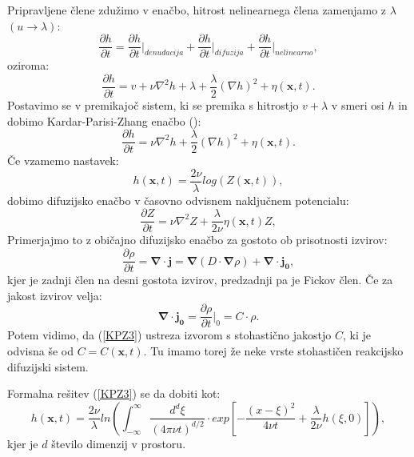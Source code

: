 \documentclass[a4paper, twoside, 12pt]{book}
\begin{document}
Pripravljene člene zdužimo v enačbo, hitrost nelinearnega člena zamenjamo z $\lambda$ $(u \rightarrow \lambda)$:
\begin{equation}
  \frac{\partial h}{\partial t} = \frac{\partial h}{\partial t} \bigg|_{denudacija} + \frac{\partial h}{\partial t} \bigg|_{difuzija} + \frac{\partial h}{\partial t} \bigg|_{nelinearno},
  \label{KPZ1}
\end{equation}
oziroma:
\begin{equation}
  \frac{\partial h}{\partial t} = v + \nu \nabla^2 h + \lambda + \frac{\lambda}{2} (\nabla h)^2 + \eta (\mathbf{x},t).
  \label{KPZ2}
\end{equation}
Postavimo se v premikajoč sistem, ki se premika s hitrostjo $v + \lambda$ v smeri osi $h$ in dobimo Kardar-Parisi-Zhang enačbo (\cite{kardar1986dynamic}):
\begin{equation}
  \frac{\partial h}{\partial t} = \nu \nabla^2 h + \frac{\lambda}{2} (\nabla h)^2 + \eta (\mathbf{x},t).
  \label{KPZ}
\end{equation}
Če vzamemo nastavek:
\begin{equation}
  h(\mathbf{x},t) = \frac{2 \nu}{\lambda} log(Z(\mathbf{x},t)),
\end{equation}
dobimo difuzijsko enačbo v časovno odvisnem naključnem potencialu:
\begin{equation}
  \frac{\partial Z}{\partial t} = \nu \nabla^2 Z + \frac{\lambda}{2 \nu} \eta(\mathbf{x},t) Z,
  \label{KPZ3}
\end{equation}
Primerjajmo to z običajno difuzijsko enačbo za gostoto ob prisotnosti izvirov:
\begin{equation}
  \frac{ \partial \rho}{ \partial t} = \mathbf{\nabla} \cdot \mathbf{j} = \mathbf{\nabla} (D \cdot \mathbf{\nabla} \rho) + \mathbf{\nabla} \cdot \mathbf{j_0},
  \label{dinamicna-splosna-3}
\end{equation}
kjer je zadnji člen na desni gostota izvirov, predzadnji pa je Fickov člen. Če za jakost izvirov velja:
\begin{equation}
  \mathbf{\nabla} \cdot \mathbf{j_0} = \frac{\partial \rho}{\partial t}\bigg|_{0} = C \cdot \rho.
  \label{jakost-izvirov}
\end{equation}
Potem vidimo, da (\ref{KPZ3}) ustreza izvorom s stohastično jakostjo $C$, ki je odvisna še od $C=C(\mathbf{x},t)$. Tu imamo torej že neke vrste stohastičen reakcijsko difuzijski sistem.

Formalna rešitev (\ref{KPZ3}) se da dobiti kot:
\begin{equation}
  h(\mathbf{x},t) = \frac{2 \nu}{\lambda} ln \left( \int_{-\infty}^{\infty} \frac{d^d \xi}{(4 \pi \nu t)^{d/2}} \cdot exp \left[-\frac{(x-\xi)^2}{4 \nu t} + \frac{\lambda}{2 \nu}h(\xi,0) \right] \right),
\end{equation}
kjer je $d$ število dimenzij v prostoru.
\end{document}
